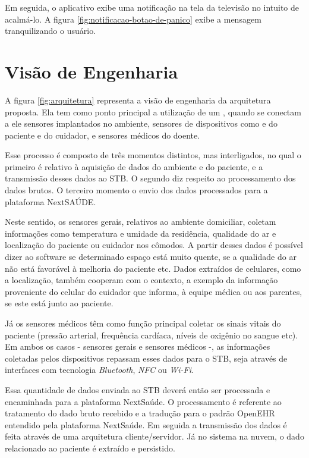 Em seguida, o aplicativo exibe uma notificação na tela da televisão no intuito
de acalmá-lo. A figura \ref{fig:notificacao-botao-de-panico} exibe a mensagem 
tranquilizando o usuário.


\section{Visão de Engenharia} \label{sec:visao-engenharia}

A figura \ref{fig:arquitetura} representa a visão de engenharia da arquitetura
proposta. Ela tem como ponto principal a utilização de um \stb[], quando se
conectam a ele sensores  implantados no ambiente, sensores de dispositivos como
\smartphones[] e  \smartwatches[] do paciente e do cuidador, e sensores médicos
do doente.


Esse processo é composto de três momentos distintos, mas  interligados, no qual
o primeiro é relativo à aquisição de dados do ambiente e do paciente, e a
transmissão desses dados ao STB. O segundo diz respeito ao processamento dos
dados brutos. O terceiro momento o envio dos dados processados para a plataforma
NextSAÚDE.

Neste sentido, os sensores gerais, relativos ao ambiente domiciliar, coletam
informações como  temperatura e umidade da residência, qualidade do ar e
localização do paciente ou cuidador nos cômodos. A partir desses dados é
possível dizer ao software se determinado espaço está muito quente, se a
qualidade do ar não está favorável à melhoria do paciente etc. Dados extraídos
de celulares, como a localização, também cooperam com o contexto, a exemplo da
informação proveniente do celular do cuidador que informa, à equipe médica ou
aos parentes, se este está junto ao paciente.

Já os sensores médicos têm como função principal coletar os sinais vitais do
paciente (pressão arterial, frequência cardíaca, níveis de oxigênio no sangue
etc). Em ambos os casos - sensores gerais e sensores médicos -, as informações
coletadas pelos dispositivos repassam  esses dados para o STB, seja através de
interfaces com tecnologia  \textit{Bluetooth}, \textit{NFC} ou \textit{Wi-Fi}.

Essa quantidade de dados enviada ao STB deverá então ser processada e encaminhada
para a plataforma NextSaúde. O processamento é referente ao tratamento do dado
bruto recebido e a tradução para o padrão OpenEHR entendido pela plataforma
NextSaúde. Em seguida a transmissão dos dados é feita através de uma
arquitetura  cliente/servidor. Já no sistema na nuvem, o dado relacionado ao
paciente é extraído e persistido.

